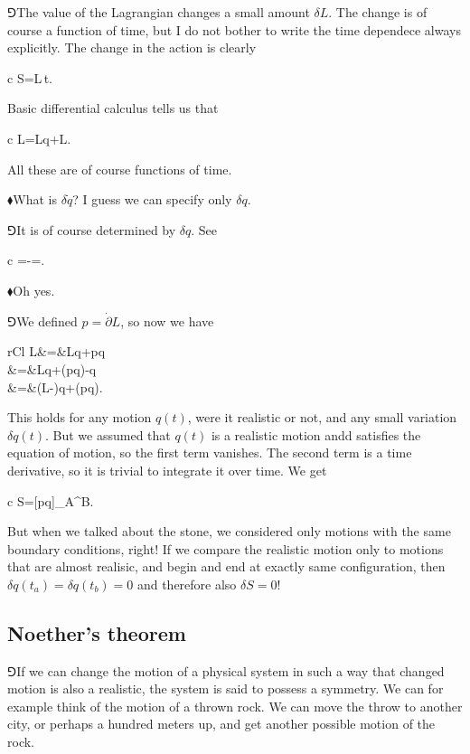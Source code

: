 \documentclass[10pt,oneside%
]{memoir}
\newenvironment{eqna}{\begin{IEEEeqnarray*}{c}}{\end{IEEEeqnarray*}\ignorespacesafterend}
\newenvironment{eqnb}{\begin{IEEEeqnarray*}{rCl}}{\end{IEEEeqnarray*}\ignorespacesafterend}
\newcommand{\der}[2]{\frac{\dd#1}{\dd#2}}
\newcommand{\dd}{\mathrm{d}}
\newcommand{\hea}{\(\blacklozenge\)\;}
\newcommand{\heb}{\(\Game\)\;}
\begin{document}
\heb The value of the Lagrangian changes a small amount \(\delta L\). The change is of course a function of time, but I do not bother to write the time dependece always explicitly. The change in the action is clearly
\begin{eqna}
    \delta S=\int\delta L\,\dd t.
\end{eqna}
Basic differential calculus tells us that
\begin{eqna}
    \delta L=\partial L\cdot\delta q+\dot{\partial}L\cdot\delta{}.
\end{eqna}
All these are of course functions of time.

\hea What is \(\delta\dot{q}\)? I guess we can specify only \(\delta q\).

\heb It is of course determined by \(\delta q\). See
\begin{eqna}
    \delta{}=\der{(q+\delta q)}{t}-\der{\delta q}{t}=\der{\delta q}{t}.
\end{eqna}

\hea Oh yes.

\heb We defined \(p=\dot{\partial}L\), so now we have
\begin{eqnb}
    \delta L&=&\partial L\cdot\delta q+p\cdot\der{}{t}\delta q\\
            &=&\partial L\cdot\delta q+\der{}{t}(p\cdot\delta q)-\cdot\delta q\\
            &=&(\partial L-)\cdot\delta q+\der{}{t}(p\cdot\delta q).
\end{eqnb}
This holds for any motion \(q(t)\), were it realistic or not, and any small variation \(\delta q(t)\). But we assumed that \(q(t)\) is a realistic motion andd satisfies the equation of motion, so the first term vanishes. The second term is a time derivative, so it is trivial to integrate it over time. We get
\begin{eqna}
    \delta S=[p\cdot\delta q]_A^B.
\end{eqna}
But when we talked about the stone, we considered only motions with the same boundary conditions, right! If we compare the realistic motion only to motions that are almost realisic, and begin and end at exactly same configuration, then \(\delta q(t_a)=\delta q(t_b)=0\) and therefore also \(\delta S=0\)!

\subsection{Noether's theorem}
\heb If we can change the motion of a physical system in such a way that changed motion is also a realistic, the system is said to possess a symmetry. We can for example think of the motion of a thrown rock. We can move the throw to another city, or perhaps a hundred meters up, and get another possible motion of the rock.
\end{document}
